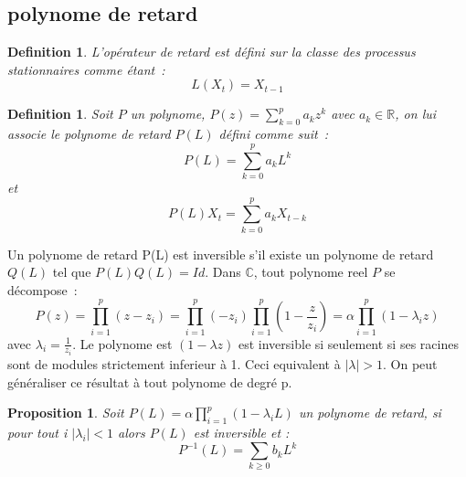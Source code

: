 \documentclass[11pt]{scrartcl} %
\newtheorem{Def}[theorem]{Definition}
\newtheorem{pro}[theorem]{Proposition}
\begin{document}
\subsection{polynome de retard}
\begin{Def}
L'opérateur de retard est défini sur la classe des processus stationnaires comme étant~: 
$$
L(X_t)=X_{t-1}
$$
\end{Def}
\begin{Def}
Soit $P$ un polynome, $P(z)=\sum_{k=0}^{p}a_kz^k$ avec $a_k\in\mathbb{R}$, on lui associe le polynome de retard $P(L)$ défini comme suit~:
$$
P(L)=\sum_{k=0}^pa_kL^k
$$
et 
$$
P(L)X_t=\sum_{k=0}^pa_kX_{t-k}
$$
\end{Def}
Un polynome de retard P(L) est inversible s'il existe un polynome de retard $Q(L)$ tel que $P(L)Q(L)=Id$. Dans $\mathbb{C}$, tout polynome reel $P$ se décompose~:
$$
P(z)=\prod_{i=1}^p(z-z_i)=\prod_{i=1}^p(-z_i)\prod_{i=1}^p(1-\frac{z}{z_i})=\alpha\prod_{i=1}^p(1-\lambda_i z)
$$
avec $\lambda_i=\frac{1}{z_i}$.
Le polynome est $(1-\lambda z)$ est inversible si seulement si ses racines sont de modules strictement inferieur à 1. Ceci equivalent à $|\lambda|>1$. On peut généraliser ce résultat à tout polynome de degré p.
\begin{pro}
Soit $P(L) = \alpha\prod_{i=1}^p(1-\lambda_i L)$ un polynome de retard, si pour tout i $|\lambda_i|<1$ alors $P(L)$ est inversible et :
$$
P^{-1}(L)= \sum_{k\geq 0}b_kL^k
$$
\end{pro}
\end{document}
